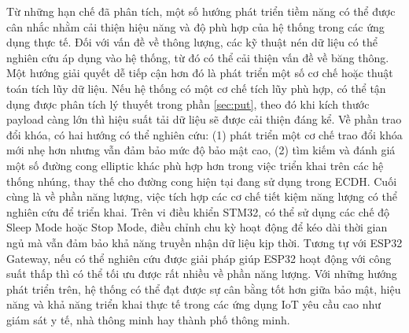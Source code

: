Từ những hạn chế đã phân tích, một số hướng phát triển tiềm năng có thể được cân nhắc nhằm cải thiện hiệu năng và độ phù hợp của hệ thống trong các ứng dụng thực tế. Đối với vấn đề về thông lượng, các kỹ thuật nén dữ liệu có thể nghiên cứu áp dụng vào hệ thống, từ đó có thể cải thiện vấn đề về băng thông. 
Một hướng giải quyết dễ tiếp cận hơn đó là phát triển một số cơ chế hoặc thuật toán tích lũy dữ liệu. Nếu hệ thống có một cơ chế tích lũy phù hợp, có thể tận dụng được phân tích lý thuyết trong phần \ref{sec:put}, theo đó khi kích thước payload càng lớn
thì hiệu suất tải dữ liệu sẽ được cải thiện đáng kể. Về phần trao đổi khóa, có hai hướng có thể nghiên cứu: (1) phát triển một cơ chế trao đổi khóa mới nhẹ hơn nhưng vẫn đảm bảo mức độ bảo mật cao, (2) tìm kiếm và đánh giá một số đường cong 
elliptic khác phù hợp hơn trong việc triển khai trên các hệ thống nhúng, thay thế cho đường cong hiện tại đang sử dụng trong ECDH. Cuối cùng là về phần năng lượng, việc tích hợp các cơ chế tiết kiệm năng lượng có thể nghiên cứu để triển khai. Trên vi điều khiển 
STM32, có thể sử dụng các chế độ Sleep Mode hoặc Stop Mode, điều chỉnh chu kỳ hoạt động để kéo dài thời gian ngủ mà vẫn đảm bảo khả năng truyền nhận dữ liệu kịp thời. Tương tự với ESP32 Gateway, nếu có thể nghiên cứu được giải pháp giúp ESP32 hoạt động với công suất thấp thì
có thể tối ưu được rất nhiều về phần năng lượng. Với những hướng phát triển trên, hệ thống có thể đạt được sự cân bằng tốt hơn giữa bảo mật, hiệu năng và khả năng triển khai thực tế trong các ứng dụng IoT yêu cầu cao như giám sát y tế, nhà thông minh hay thành phố thông minh.

